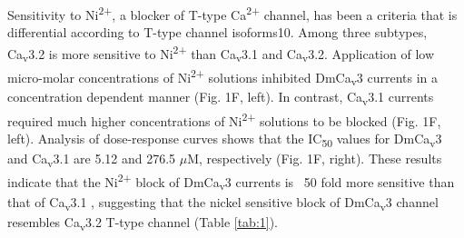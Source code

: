 Sensitivity to Ni\textsuperscript{2+}, a blocker of T-type Ca\textsuperscript{2+} channel, has been a criteria that is differential according to T-type channel isoforms10.
Among three subtypes, Ca\textsubscript{v}3.2 is more sensitive to Ni\textsuperscript{2+} than Ca\textsubscript{v}3.1 and Ca\textsubscript{v}3.2.
Application of low micro-molar concentrations of Ni\textsuperscript{2+} solutions inhibited DmCa\textsubscript{v}3 currents in a concentration dependent manner (Fig. 1F, left).
In contrast, Ca\textsubscript{v}3.1 currents required much higher concentrations of Ni\textsuperscript{2+} solutions to be blocked (Fig. 1F, left).
Analysis of dose-response curves shows that the IC\textsubscript{50} values for DmCa\textsubscript{v}3 and Ca\textsubscript{v}3.1 are 5.12 and 276.5 $\mu$M, respectively (Fig. 1F, right).
These results indicate that the Ni\textsuperscript{2+} block of DmCa\textsubscript{v}3 currents is ~50 fold more sensitive than that of Ca\textsubscript{v}3.1 , suggesting that the nickel sensitive block of DmCa\textsubscript{v}3 channel resembles Ca\textsubscript{v}3.2 T-type channel (Table \ref{tab:1}).
    
    
